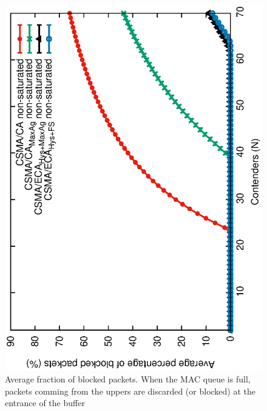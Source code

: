 	\begin{figure}[htb!]
		\centering
		\includegraphics[width=0.7\linewidth,angle=-90]{figures/unsaturated/blockingProb-unsat/blocking-unsaturated-TON.eps}
		\caption{Average fraction of blocked packets. When the MAC queue is full, packets comming from the uppers are discarded (or blocked) at the entrance of the buffer}
		\label{fig:blocked-packets}
	\end{figure}	
	

